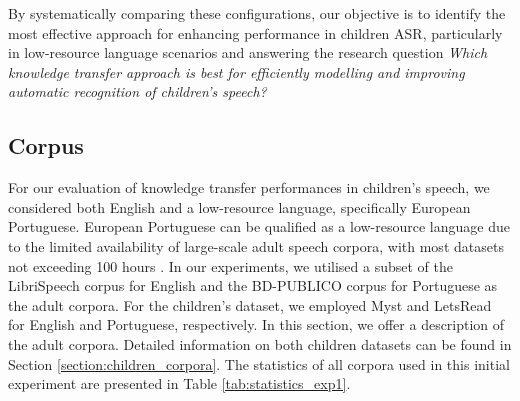 By systematically comparing these configurations, our objective is to identify the most effective approach for enhancing performance in children \ac{ASR}, particularly in low-resource language scenarios and answering the research question  \textit{Which knowledge transfer approach is best for efficiently modelling and improving automatic recognition of children's speech?} 


\subsection{Corpus}
\label{sec:corpus}
For our evaluation of knowledge transfer performances in children's speech, we considered both English and a low-resource language, specifically European Portuguese. European Portuguese can be qualified as a low-resource language due to the limited availability of large-scale adult speech corpora, with most datasets not exceeding 100 hours \cite{tribus}.
In our experiments, we utilised a subset of the LibriSpeech corpus for English and the BD-PUBLICO corpus for Portuguese as the adult corpora. For the children's dataset, we employed Myst and LetsRead for English and Portuguese, respectively. In this section, we offer a description of the adult corpora. Detailed information on both children datasets can be found in Section  \ref{section:children_corpora}. The statistics of all corpora used in this initial experiment are presented in Table \ref{tab:statistics_exp1}.

